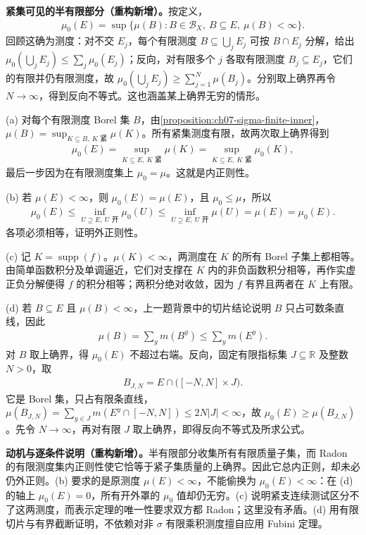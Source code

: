 \documentclass[../../main.tex]{subfiles}
\begin{document}
\begin{solution}
\textbf{紧集可见的半有限部分（重构新增）。}按定义，
\begin{align*}
\mu_0(E)=\sup\{\mu(B):B\in\mathscr B_X,\ B\subseteq E,\ \mu(B)<\infty\}.
\end{align*}
回顾这确为测度：对不交 $E_j$，每个有限测度 $B\subseteq\bigcup_jE_j$ 可按 $B\cap E_j$ 分解，给出 $\mu_0(\bigcup_jE_j)\leqslant\sum_j\mu_0(E_j)$；反向，对有限多个 $j$ 各取有限测度 $B_j\subseteq E_j$，它们的有限并仍有限测度，故 $\mu_0(\bigcup_jE_j)\geqslant\sum_{j=1}^N\mu(B_j)$。分别取上确界再令 $N\to\infty$，得到反向不等式。这也涵盖某上确界无穷的情形。

(a) 对每个有限测度 Borel 集 $B$，由\cref{proposition:ch07-sigma-finite-inner}，$\mu(B)=\sup_{K\subseteq B,\ K\text{ 紧}}\mu(K)$。所有紧集测度有限，故两次取上确界得到
\begin{align*}
\mu_0(E)=\sup_{K\subseteq E,\ K\text{ 紧}}\mu(K)
=\sup_{K\subseteq E,\ K\text{ 紧}}\mu_0(K),
\end{align*}
最后一步因为在有限测度集上 $\mu_0=\mu$。这就是内正则性。

(b) 若 $\mu(E)<\infty$，则 $\mu_0(E)=\mu(E)$，且 $\mu_0\leqslant\mu$，所以
\begin{align*}
\mu_0(E)\leqslant\inf_{U\supseteq E,\ U\text{ 开}}\mu_0(U)
\leqslant\inf_{U\supseteq E,\ U\text{ 开}}\mu(U)=\mu(E)=\mu_0(E).
\end{align*}
各项必须相等，证明外正则性。

(c) 记 $K=\operatorname{supp}(f)$。$\mu(K)<\infty$，两测度在 $K$ 的所有 Borel 子集上都相等。由简单函数积分及单调逼近，它们对支撑在 $K$ 内的非负函数积分相等，再作实虚正负分解便得 $f$ 的积分相等；两积分绝对收敛，因为 $f$ 有界且两者在 $K$ 上有限。

(d) 若 $B\subseteq E$ 且 $\mu(B)<\infty$，上一题背景中的切片结论说明 $B$ 只占可数条直线，因此
\begin{align*}
\mu(B)=\sum_y m(B^y)\leqslant\sum_y m(E^y).
\end{align*}
对 $B$ 取上确界，得 $\mu_0(E)$ 不超过右端。反向，固定有限指标集 $J\subseteq\mathbb R$ 及整数 $N>0$，取
\begin{align*}
B_{J,N}=E\cap\bigl([-N,N]\times J\bigr).
\end{align*}
它是 Borel 集，只占有限条直线，$\mu(B_{J,N})=\sum_{y\in J}m(E^y\cap[-N,N])\leqslant2N|J|<\infty$，故 $\mu_0(E)\geqslant\mu(B_{J,N})$。先令 $N\to\infty$，再对有限 $J$ 取上确界，即得反向不等式及所求公式。
\end{solution}
\begin{remark}
\textbf{动机与逐条件说明（重构新增）。}半有限部分收集所有有限质量子集，而 Radon 的有限测度集内正则性使它恰等于紧子集质量的上确界。因此它总内正则，却未必仍外正则。(b) 要求的是原测度 $\mu(E)<\infty$，不能偷换为 $\mu_0(E)<\infty$：在 (d) 的轴上 $\mu_0(E)=0$，所有开外罩的 $\mu_0$ 值却仍无穷。(c) 说明紧支连续测试区分不了这两测度，而表示定理的唯一性要求双方都 Radon；这里没有矛盾。(d) 用有限切片与有界截断证明，不依赖对非 $\sigma$ 有限乘积测度擅自应用 Fubini 定理。
\end{remark}

\end{document}
